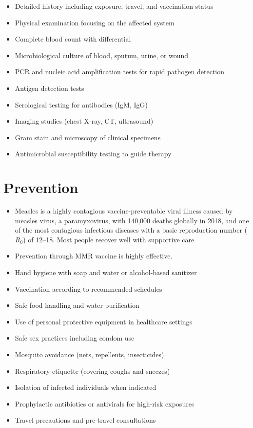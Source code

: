 \begin{itemize}[noitemsep]
  \item Detailed history including exposure, travel, and vaccination status
  \item Physical examination focusing on the affected system
  \item Complete blood count with differential
  \item Microbiological culture of blood, sputum, urine, or wound
  \item PCR and nucleic acid amplification tests for rapid pathogen detection
  \item Antigen detection tests
  \item Serological testing for antibodies (IgM, IgG)
  \item Imaging studies (chest X-ray, CT, ultrasound)
  \item Gram stain and microscopy of clinical specimens
  \item Antimicrobial susceptibility testing to guide therapy
\end{itemize}
\section{Prevention}
\begin{itemize}[noitemsep]
  \item Measles is a highly contagious vaccine-preventable viral illness caused by measles virus, a paramyxovirus, with 140,000 deaths globally in 2018, and one of the most contagious infectious diseases with a basic reproduction number ($R_0$) of 12--18. Most people recover well with supportive care
  \item Prevention through MMR vaccine is highly effective.
  \item Hand hygiene with soap and water or alcohol-based sanitizer
  \item Vaccination according to recommended schedules
  \item Safe food handling and water purification
  \item Use of personal protective equipment in healthcare settings
  \item Safe sex practices including condom use
  \item Mosquito avoidance (nets, repellents, insecticides)
  \item Respiratory etiquette (covering coughs and sneezes)
  \item Isolation of infected individuals when indicated
  \item Prophylactic antibiotics or antivirals for high-risk exposures
  \item Travel precautions and pre-travel consultations
\end{itemize}
